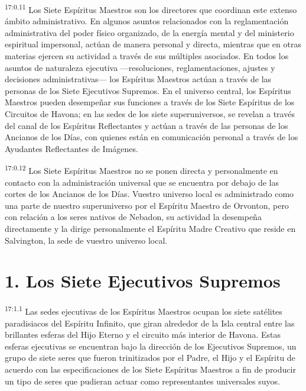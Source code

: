 \par
\textsuperscript{17:0.11} Los Siete Espíritus Maestros son los directores que coordinan este extenso ámbito administrativo. En algunos asuntos relacionados con la reglamentación administrativa del poder físico organizado, de la energía mental y del ministerio espiritual impersonal, actúan de manera personal y directa, mientras que en otras materias ejercen su actividad a través de sus múltiples asociados. En todos los asuntos de naturaleza ejecutiva ---resoluciones, reglamentaciones, ajustes y decisiones administrativas--- los Espíritus Maestros actúan a través de las personas de los Siete Ejecutivos Supremos. En el universo central, los Espíritus Maestros pueden desempeñar sus funciones a través de los Siete Espíritus de los Circuitos de Havona; en las sedes de los siete superuniversos, se revelan a través del canal de los Espíritus Reflectantes y actúan a través de las personas de los Ancianos de los Días, con quienes están en comunicación personal a través de los Ayudantes Reflectantes de Imágenes.

\par
\textsuperscript{17:0.12} Los Siete Espíritus Maestros no se ponen directa y personalmente en contacto con la administración universal que se encuentra por debajo de las cortes de los Ancianos de los Días. Vuestro universo local es administrado como una parte de nuestro superuniverso por el Espíritu Maestro de Orvonton, pero con relación a los seres nativos de Nebadon, su actividad la desempeña directamente y la dirige personalmente el Espíritu Madre Creativo que reside en Salvington, la sede de vuestro universo local.

\section*{1. Los Siete Ejecutivos Supremos}
\par
\textsuperscript{17:1.1} Las sedes ejecutivas de los Espíritus Maestros ocupan los siete satélites paradisiacos del Espíritu Infinito, que giran alrededor de la Isla central entre las brillantes esferas del Hijo Eterno y el circuito más interior de Havona. Estas esferas ejecutivas se encuentran bajo la dirección de los Ejecutivos Supremos, un grupo de siete seres que fueron trinitizados por el Padre, el Hijo y el Espíritu de acuerdo con las especificaciones de los Siete Espíritus Maestros a fin de producir un tipo de seres que pudieran actuar como representantes universales suyos.

